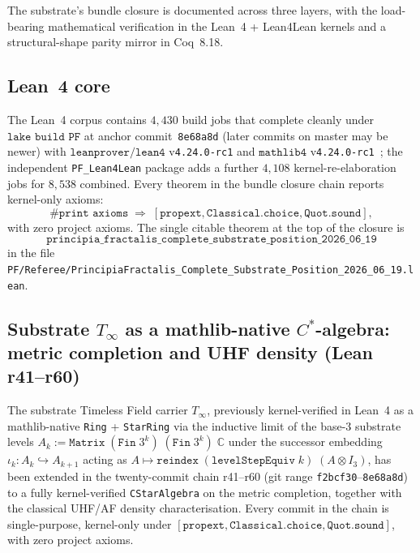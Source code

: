 \documentclass[11pt,a4paper]{amsart}
\theoremstyle{plain}
\theoremstyle{definition}
\begin{document}
The substrate's bundle closure is documented across three layers, with the load-bearing mathematical verification in the Lean~4 + Lean4Lean kernels and a structural-shape parity mirror in Coq~8.18.

\subsection{Lean~4 core}

The Lean~4 corpus contains $4{,}430$ build jobs that complete cleanly under $\texttt{lake build PF}$ at anchor commit~\texttt{8e68a8d} (later commits on master may be newer) with $\texttt{leanprover/lean4}$ v\texttt{4.24.0-rc1} and $\texttt{mathlib4}$ v\texttt{4.24.0-rc1}~\cite{moura-ullrich2021,mathlib2020}; the independent \texttt{PF\_Lean4Lean} package adds a further $4{,}108$ kernel-re-elaboration jobs for $8{,}538$ combined. Every theorem in the bundle closure chain reports kernel-only axioms:
\[
\texttt{\#print axioms} \;\Longrightarrow\; [\texttt{propext}, \texttt{Classical.choice}, \texttt{Quot.sound}],
\]
with zero project axioms. The single citable theorem at the top of the closure is
\[
\texttt{principia\_fractalis\_complete\_substrate\_position\_2026\_06\_19}
\]
in the file \texttt{PF/Referee/PrincipiaFractalis\_Complete\_Substrate\_Position\_2026\_06\_19.lean}.

\subsection{Substrate \texorpdfstring{$T_\infty$}{T\_infty} as a mathlib-native \texorpdfstring{$C^*$}{C*}-algebra: metric completion and UHF density (Lean r41--r60)}\label{subsec:substrate-cstar-completion}

The substrate Timeless Field carrier $T_\infty$, previously kernel-verified in Lean~4 as a mathlib-native \texttt{Ring} + \texttt{StarRing} via the inductive limit of the base-3 substrate levels $A_k := \texttt{Matrix}\;(\texttt{Fin}\;3^k)\;(\texttt{Fin}\;3^k)\;\mathbb{C}$ under the successor embedding $\iota_k : A_k \hookrightarrow A_{k+1}$ acting as $A \mapsto \texttt{reindex}\;(\texttt{levelStepEquiv}\;k)\;(A \otimes I_3)$, has been extended in the twenty-commit chain r41--r60 (git range \texttt{f2bcf30}--\texttt{8e68a8d}) to a fully kernel-verified \texttt{CStarAlgebra} on the metric completion, together with the classical UHF/AF density characterisation. Every commit in the chain is single-purpose, kernel-only under $[\texttt{propext}, \texttt{Classical.choice}, \texttt{Quot.sound}]$, with zero project axioms.
\end{document}
